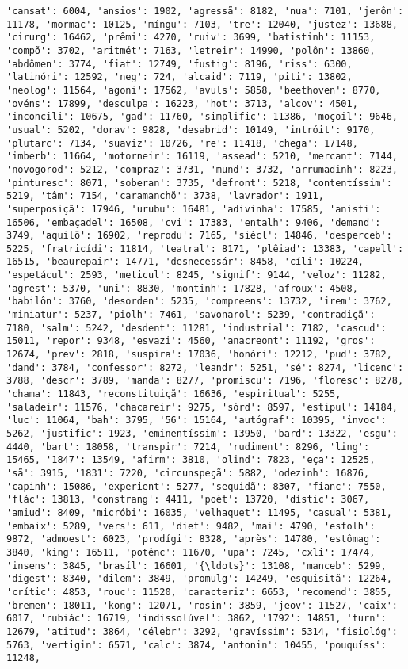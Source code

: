\begin{Verbatim}[commandchars=\\\{\}]
'cansat': 6004, 'ansios': 1902, 'agressã': 8182, 'nua': 7101, 'jerôn': 11178, 'mormac': 10125, 'míngu': 7103, 'tre': 12040, 'justez': 13688, 'cirurg': 16462, 'prêmi': 4270, 'ruiv': 3699, 'batistinh': 11153, 'compõ': 3702, 'aritmét': 7163, 'letreir': 14990, 'polôn': 13860, 'abdômen': 3774, 'fiat': 12749, 'fustig': 8196, 'riss': 6300, 'latinóri': 12592, 'neg': 724, 'alcaid': 7119, 'piti': 13802, 'neolog': 11564, 'agoni': 17562, 'avuls': 5858, 'beethoven': 8770, 'ovéns': 17899, 'desculpa': 16223, 'hot': 3713, 'alcov': 4501, 'inconcili': 10675, 'gad': 11760, 'simplific': 11386, 'moçoil': 9646, 'usual': 5202, 'dorav': 9828, 'desabrid': 10149, 'intróit': 9170, 'plutarc': 7134, 'suaviz': 10726, 're': 11418, 'chega': 17148, 'imberb': 11664, 'motorneir': 16119, 'assead': 5210, 'mercant': 7144, 'novogorod': 5212, 'compraz': 3731, 'mund': 3732, 'arrumadinh': 8223, 'pinturesc': 8071, 'soberan': 3735, 'defront': 5218, 'contentíssim': 5219, 'tâm': 7154, 'caramanchõ': 3738, 'lavrador': 1911, 'superposiçã': 17946, 'urubu': 16481, 'adivinha': 17585, 'anisti': 16506, 'embaçadel': 16508, 'cvi': 17383, 'entalh': 9406, 'demand': 3749, 'aquilõ': 16902, 'reprodu': 7165, 'siècl': 14846, 'desperceb': 5225, 'fratricídi': 11814, 'teatral': 8171, 'plêiad': 13383, 'capell': 16515, 'beaurepair': 14771, 'desnecessár': 8458, 'cíli': 10224, 'espetácul': 2593, 'meticul': 8245, 'signif': 9144, 'veloz': 11282, 'agrest': 5370, 'uni': 8830, 'montinh': 17828, 'afroux': 4508, 'babilôn': 3760, 'desorden': 5235, 'compreens': 13732, 'irem': 3762, 'miniatur': 5237, 'piolh': 7461, 'savonarol': 5239, 'contradiçã': 7180, 'salm': 5242, 'desdent': 11281, 'industrial': 7182, 'cascud': 15011, 'repor': 9348, 'esvazi': 4560, 'anacreont': 11192, 'gros': 12674, 'prev': 2818, 'suspira': 17036, 'honóri': 12212, 'pud': 3782, 'dand': 3784, 'confessor': 8272, 'leandr': 5251, 'sé': 8274, 'licenc': 3788, 'descr': 3789, 'manda': 8277, 'promiscu': 7196, 'floresc': 8278, 'chama': 11843, 'reconstituiçã': 16636, 'espiritual': 5255, 'saladeir': 11576, 'chacareir': 9275, 'sórd': 8597, 'estipul': 14184, 'luc': 11064, 'bah': 3795, '56': 15164, 'autógraf': 10395, 'invoc': 5262, 'justific': 1923, 'eminentíssim': 13950, 'bard': 13322, 'esgu': 4440, 'bart': 18058, 'transpir': 7214, 'rudiment': 8296, 'ling': 15465, '1847': 13549, 'afirm': 3810, 'olind': 7823, 'eça': 12525, 'sã': 3915, '1831': 7220, 'circunspeçã': 5882, 'odezinh': 16876, 'capinh': 15086, 'experient': 5277, 'sequidã': 8307, 'fianc': 7550, 'flác': 13813, 'constrang': 4411, 'poèt': 13720, 'dístic': 3067, 'amiud': 8409, 'micróbi': 16035, 'velhaquet': 11495, 'casual': 5381, 'embaix': 5289, 'vers': 611, 'diet': 9482, 'mai': 4790, 'esfolh': 9872, 'admoest': 6023, 'prodígi': 8328, 'après': 14780, 'estômag': 3840, 'king': 16511, 'potênc': 11670, 'upa': 7245, 'cxli': 17474, 'insens': 3845, 'brasíl': 16601, '{\ldots}': 13108, 'manceb': 5299, 'digest': 8340, 'dilem': 3849, 'promulg': 14249, 'esquisitã': 12264, 'crític': 4853, 'rouc': 11520, 'caracteriz': 6653, 'recomend': 3855, 'bremen': 18011, 'kong': 12071, 'rosin': 3859, 'jeov': 11527, 'caix': 6017, 'rubiác': 16719, 'indissolúvel': 3862, '1792': 14851, 'turn': 12679, 'atitud': 3864, 'célebr': 3292, 'gravíssim': 5314, 'fisiológ': 5763, 'vertigin': 6571, 'calc': 3874, 'antonin': 10455, 'pouquíss': 11248, 
\end{Verbatim}
